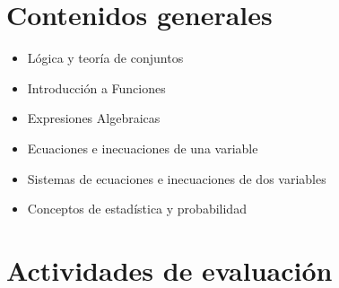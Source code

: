 \documentclass[a4,11pt]{aleph-notas}
\begin{document}
\section{Contenidos generales} 

\begin{itemize}
\item 
    Lógica y teoría de conjuntos
\item 
    Introducción a Funciones
\item 
    Expresiones Algebraicas
\item 
    Ecuaciones e inecuaciones de una variable
\item 
    Sistemas de ecuaciones e inecuaciones de dos variables
\item 
    Conceptos de estadística y probabilidad
\end{itemize}

\section{Actividades de evaluación} 
\end{document}

